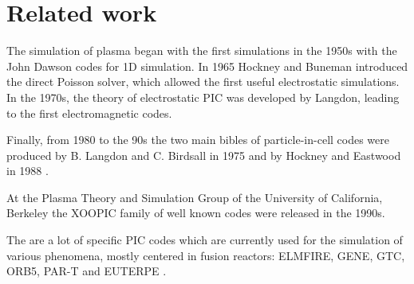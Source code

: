 \chapter{Related work}

The simulation of plasma began with the first simulations in the 1950s with the
John Dawson codes for 1D simulation. In 1965 Hockney and Buneman introduced the
direct Poisson solver, which allowed the first useful electrostatic simulations.
In the 1970s, the theory of electrostatic PIC was developed by Langdon, leading
to the first electromagnetic codes.

Finally, from 1980 to the 90s the two main bibles of particle-in-cell codes were
produced  by B. Langdon and C. Birdsall in 1975 \cite{birdsall} and by Hockney
and Eastwood in 1988 \cite{hockney}.

At the Plasma Theory and Simulation Group of the University of California,
Berkeley the XOOPIC \cite{xoopic} family of well known codes were released in
the 1990s.

The are a lot of specific PIC codes which are currently used for the simulation
of various phenomena, mostly centered in fusion reactors: ELMFIRE, GENE, GTC,
ORB5, PAR-T and EUTERPE \cite{euterpe}.

